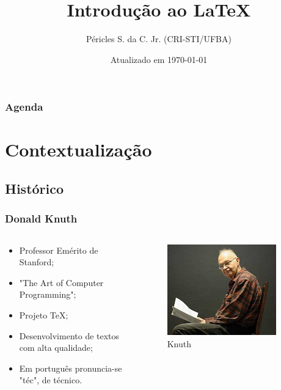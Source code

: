 \documentclass[14pt]{beamer}
\title{Introdução ao \LaTeX}
\author{Péricles S. da C. Jr. (CRI-STI/UFBA)}
\date{\small Atualizado em \today}
\begin{document}
\begin{frame}
  \maketitle
\end{frame}

\begin{frame}
  \frametitle{Agenda}
  \tableofcontents
\end{frame}

\section{Contextualização}

\subsection{Histórico}

\begin{frame}
  \frametitle{Donald Knuth}
  \begin{columns}
      \begin{column}{0.6\textwidth}
        \begin{itemize}
          \item <2-> Professor Emérito de Stanford;
          \item <3-> "The Art of Computer Programming";
          \item <4-> Projeto \TeX;
          \item <5-> Desenvolvimento de textos com alta qualidade;
          \item <6-> Em português pronuncia-se "téc", de técnico.          
        \end{itemize}
      \end{column}
      \begin{column}{0.4\textwidth}
        \begin{figure}
          \includegraphics[width=0.9\textwidth]{img/knuth.jpeg}
          \caption{Knuth}
        \end{figure}
      \end{column}
  \end{columns}

\end{frame}
\end{document}
